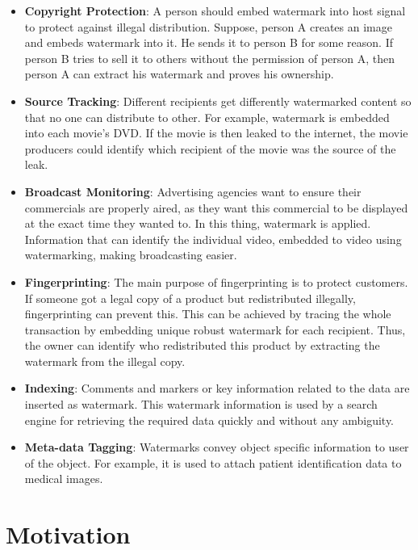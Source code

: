 \documentclass[12pt,a4paper]{report}
\begin{document}
\begin{itemize}

\item \textbf{Copyright Protection}: A person should embed watermark into host signal to protect against illegal distribution. Suppose, person A creates an image and embeds watermark into it. He sends it to person B for some reason. If person B tries to sell it to others without the permission of person A, then person A can extract his watermark and proves his ownership.

\item \textbf{Source Tracking}: Different recipients get differently watermarked content so that no one can distribute to other. For example, watermark is embedded into each movie's DVD. If the movie is then leaked to the internet, the movie producers could identify which recipient of the movie was the source of the leak.

\item \textbf{Broadcast Monitoring}: Advertising agencies want to ensure their commercials are properly aired, as they want this commercial to be displayed at the exact time they wanted to. In this thing, watermark is applied. Information that can identify the individual video, embedded to video using watermarking, making broadcasting easier.

\item \textbf{Fingerprinting}: The main purpose of fingerprinting is to protect customers. If someone got a legal copy of a product but redistributed illegally, fingerprinting can prevent this. This can be achieved
by tracing the whole transaction by embedding unique robust watermark for each recipient. Thus, the owner can identify who redistributed this product by extracting the
watermark from the illegal copy.

\item \textbf{Indexing}: Comments and markers or key information related to the data are inserted as watermark. This watermark information is used by a search engine for retrieving the required data quickly and without any ambiguity.

\item \textbf{Meta-data Tagging}: Watermarks convey object specific information to user of the object. For example, it is used to attach patient identification data to medical images.

\end{itemize}

\section{Motivation}
\end{document}
